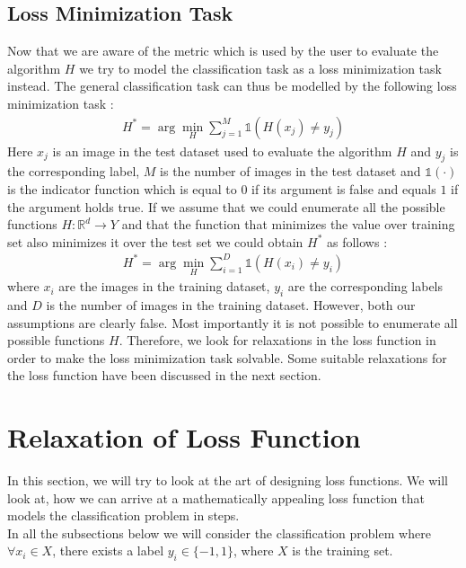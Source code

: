 \documentclass[12pt]{article}
\begin{document}
\subsection{Loss Minimization Task}
Now that we are aware of the metric which is used by the user to evaluate the algorithm $H$ we try to model the classification task as a loss minimization task instead. The general classification task can thus be modelled by the following loss minimization task :\\
\begin{align*}
    H^{*} = \arg \min_{H}\sum_{j=1}^{M}\mathds{1}(H(x_j) \neq y_j)
\end{align*}
Here $x_j$ is an image in the test dataset used to evaluate the algorithm $H$ and $y_j$ is the corresponding label, $M$ is the number of images in the test dataset and $\mathds{1}(\cdot)$ is the indicator function which is equal to $0$ if its argument is false and equals $1$ if the argument holds true. If we assume that we could enumerate all the possible functions $H : \mathbb{R}^d \rightarrow Y$ and that the function that minimizes the value over training set also minimizes it over the test set we could obtain $H^{*}$ as follows :
\begin{align*}
    H^{*} = \arg \min_{H}\sum_{i=1}^{D}\mathds{1}(H(x_i) \neq y_i)
\end{align*}
where $x_i$ are the images in the training dataset, $y_i$ are the corresponding labels and $D$ is the number of images in the training dataset. However, both our assumptions are clearly false. Most importantly it is not possible to enumerate all possible functions $H$. Therefore, we look for relaxations in the loss function in order to make the loss minimization task solvable. Some suitable relaxations for the loss function have been discussed in the next section.
\section{Relaxation of Loss Function}
In this section, we will try to look at the art of designing loss functions. We will look at, how we can arrive at a mathematically appealing loss function that models the classification problem in steps.\\
In all the subsections below we will consider the classification problem where $\forall x_i \in X$, there exists a label $y_i \in \{-1,1\}$, where $X$ is the training set.
\end{document}
